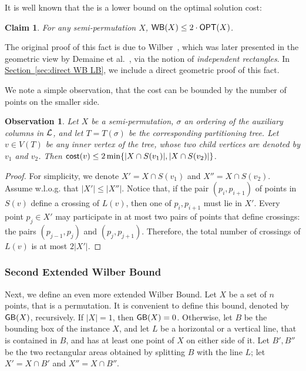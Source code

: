 \documentclass[11pt]{article}
\numberwithin{equation}{section}
\newtheorem{claim}[theorem]{Claim}
\theoremstyle{definition}
\theoremstyle{plain}
\newcommand{\expref}[2]{\hyperref[#2]{#1~\ref{#2}}}
\newtheorem{myobs}[theorem]{Observation}
\begin{document}
It is well known that the \WBone is a lower bound on the optimal solution cost:

\begin{claim}\label{claim: bounding WB by OPT}
	For any semi-permutation $X$, $\mathsf{WB}(X)\leq 2 \cdot \mbox{\sf OPT}(X)$.
\end{claim} 

The original proof of this fact is due to Wilber~\cite{wilber}, which was later presented in the geometric view by Demaine et al.~\cite{DHIKP09}, via the notion of \emph{independent rectangles}. In \expref{Section}{sec:direct WB LB}, we include a direct geometric proof of this fact. 

We note a simple observation, that the cost can be bounded by the number of points on the smaller side.
 
\begin{myobs}\label{obs: number of crossings at most min of both sides}
	Let $X$ be a semi-permutation, $\sigma$ an ordering of the auxiliary columns in ${\mathcal L}$, and let $T=T({\sigma})$ be the corresponding partitioning tree. Let $v\in V(T)$ be any inner vertex of the tree, whose two child vertices are denoted by $v_1$ and $v_2$. 
Then $\mathsf{cost}(v) \leq 2 \min \{|X \cap S(v_1)|, |X \cap S(v_2)| \}$. 
\end{myobs}
\begin{proof}
For simplicity, we denote $X' =  X \cap S(v_1)$ and $X'' = X \cap S(v_2)$. 
Assume w.l.o.g. that $|X'|\leq |X''|$. Notice that, if the pair $(p_i,p_{i+1})$ of points in $S(v)$ define a crossing of $L(v)$, then one of $p_i,p_{i+1}$ must lie in $X'$. 
Every point $p_j\in X'$ may participate in at most two pairs of points that define crossings: the pairs $(p_{j-1},p_j)$ and $(p_j,p_{j+1})$. 
Therefore, the total number of crossings of $L(v)$ is at most $2|X'|$.
\end{proof}



%

%
%
%
%
%
%
%











\iffalse 
\subsubsection{Second Extended Wilber Bound}
Next, we define an even more extended Wilber Bound. Let $X$ be a set of $n$ points, that is a permutation. It is convenient to define this bound, denoted by $\mathsf{GB}(X)$, recursively. If $|X|=1$, then $\mathsf{GB}(X)=0$. Otherwise, let $B$ be the bounding box of the instance $X$, and let $L$ be a horizontal or a vertical line, that is contained in $B$, and has at least one point of $X$ on either side of it. Let $B',B''$ be the two rectangular areas obtained by splitting $B$ with the line $L$; let $X'=X\cap B'$ and $X''=X\cap B''$.
\end{document}
